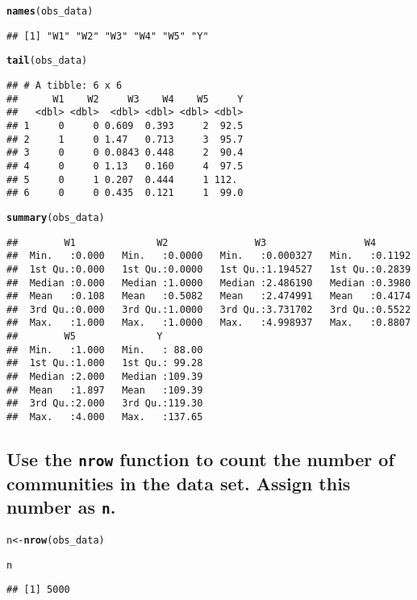 \documentclass{article}\usepackage[]{graphicx}\usepackage[]{xcolor}
\makeatletter
\newcommand{\hlstd}[1]{\textcolor[rgb]{0.345,0.345,0.345}{#1}}%
\newcommand{\hlkwb}[1]{\textcolor[rgb]{0.69,0.353,0.396}{#1}}%
\newcommand{\hlkwd}[1]{\textcolor[rgb]{0.737,0.353,0.396}{\textbf{#1}}}%
\newenvironment{kframe}{%
 \def\at@end@of@kframe{}%
 \ifinner\ifhmode%
  \def\at@end@of@kframe{\end{minipage}}%
  \begin{minipage}{\columnwidth}%
 \fi\fi%
 \def\FrameCommand##1{\hskip\@totalleftmargin \hskip-\fboxsep
 \colorbox{shadecolor}{##1}\hskip-\fboxsep
     \hskip-\linewidth \hskip-\@totalleftmargin \hskip\columnwidth}%
 \MakeFramed {\advance\hsize-\width
   \@totalleftmargin\z@ \linewidth\hsize
   \@setminipage}}%
 {\par\unskip\endMakeFramed%
 \at@end@of@kframe}
\newenvironment{knitrout}{}{} %
\makeatother
\begin{document}
\begin{knitrout}
\color{fgcolor}\begin{kframe}
\begin{alltt}
\hlkwd{names}\hlstd{(obs_data)}
\end{alltt}
\begin{verbatim}
## [1] "W1" "W2" "W3" "W4" "W5" "Y"
\end{verbatim}
\begin{alltt}
\hlkwd{tail}\hlstd{(obs_data)}
\end{alltt}
\begin{verbatim}
## # A tibble: 6 x 6
##      W1    W2     W3    W4    W5     Y
##   <dbl> <dbl>  <dbl> <dbl> <dbl> <dbl>
## 1     0     0 0.609  0.393     2  92.5
## 2     1     0 1.47   0.713     3  95.7
## 3     0     0 0.0843 0.448     2  90.4
## 4     0     0 1.13   0.160     4  97.5
## 5     0     1 0.207  0.444     1 112. 
## 6     0     0 0.435  0.121     1  99.0
\end{verbatim}
\begin{alltt}
\hlkwd{summary}\hlstd{(obs_data)}
\end{alltt}
\begin{verbatim}
##        W1              W2               W3                 W4        
##  Min.   :0.000   Min.   :0.0000   Min.   :0.000327   Min.   :0.1192  
##  1st Qu.:0.000   1st Qu.:0.0000   1st Qu.:1.194527   1st Qu.:0.2839  
##  Median :0.000   Median :1.0000   Median :2.486190   Median :0.3980  
##  Mean   :0.108   Mean   :0.5082   Mean   :2.474991   Mean   :0.4174  
##  3rd Qu.:0.000   3rd Qu.:1.0000   3rd Qu.:3.731702   3rd Qu.:0.5522  
##  Max.   :1.000   Max.   :1.0000   Max.   :4.998937   Max.   :0.8807  
##        W5              Y         
##  Min.   :1.000   Min.   : 88.00  
##  1st Qu.:1.000   1st Qu.: 99.28  
##  Median :2.000   Median :109.39  
##  Mean   :1.897   Mean   :109.39  
##  3rd Qu.:2.000   3rd Qu.:119.30  
##  Max.   :4.000   Max.   :137.65
\end{verbatim}
\end{kframe}
\end{knitrout}
  
  
  \subsection{Use the \texttt{nrow} function to count the number of communities in the data set. Assign this number as \texttt{n}.}
  
\begin{knitrout}
\color{fgcolor}\begin{kframe}
\begin{alltt}
\hlstd{n} \hlkwb{<-} \hlkwd{nrow}\hlstd{(obs_data)}

\hlstd{n}
\end{alltt}
\begin{verbatim}
## [1] 5000
\end{verbatim}
\end{kframe}
\end{knitrout}
\end{document}
